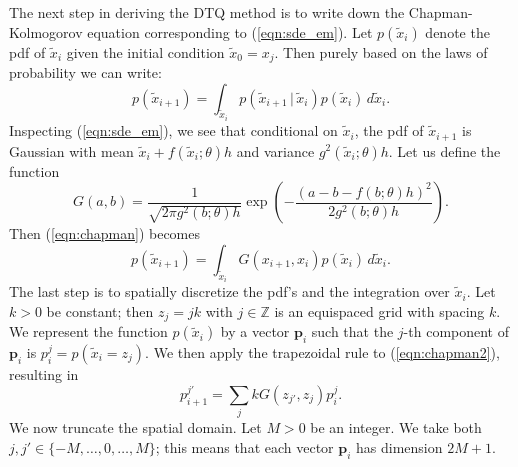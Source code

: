 \documentclass[wcp]{jmlr}
\begin{document}
The next step in deriving the DTQ method is to write down the
Chapman-Kolmogorov equation corresponding to (\ref{eqn:sde_em}).  Let
$p(\tilde{x}_{i})$ denote the pdf of $\tilde{x}_i$ given the initial
condition $\tilde{x}_0 = x_j$.  Then purely based on the laws of
probability we can write:
\begin{equation}
\label{eqn:chapman}
p(\tilde{x}_{i+1}) = \int_{\tilde{x}_i} p(\tilde{x}_{i+1} \, | \,
\tilde{x}_i) p(\tilde{x}_i) \, d \tilde{x}_i.
\end{equation}
Inspecting (\ref{eqn:sde_em}), we see that conditional on
$\tilde{x}_i$, the pdf of $\tilde{x}_{i+1}$ is Gaussian with mean
$\tilde{x}_i + f(\tilde{x}_i; \theta) h$ and variance
$g^2(\tilde{x}_i; \theta) h$.  Let us define the function
\begin{equation}
\label{eqn:kernel}
G(a,b) = \frac{1}{\sqrt{2 \pi g^2(b;\theta) h}} \exp \left( -\frac{ (a - b -
  f(b;\theta) h)^2 }{2 g^2(b; \theta) h}  \right).
\end{equation}
Then (\ref{eqn:chapman}) becomes
\begin{equation}
\label{eqn:chapman2}
p(\tilde{x}_{i+1}) = \int_{\tilde{x}_i} G(x_{i+1},x_i) p(\tilde{x}_i)
\, d \tilde{x}_i.
\end{equation}
The last step is to spatially discretize the pdf's and the integration
over $\tilde{x}_i$.  Let $k > 0$ be constant; then $z_j = jk$ with $j
\in \mathbb{Z}$ is an equispaced grid with spacing $k$.
We represent the function $p(\tilde{x}_i)$ by a vector $\mathbf{p}_i$
such that the $j$-th component of $\mathbf{p}_i$ is $p_i^j =
p(\tilde{x}_i = z_j)$.  We then apply the trapezoidal rule to
(\ref{eqn:chapman2}), resulting in
\begin{equation}
\label{eqn:chapman3}
p_{i+1}^{j'} = \sum_j k G(z_{j'}, z_j) p_i^j.
\end{equation}
We now truncate the spatial domain.  Let $M > 0$ be an integer.  We
take both $j, j' \in \{-M, \ldots, 0, \ldots, M\}$; this means that
each vector $\mathbf{p}_i$ has dimension $2M+1$.
\end{document}
